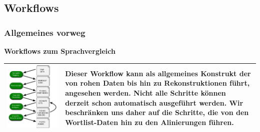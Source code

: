\subsection{\texorpdfstring{{Workflows}}{Workflows}}

\subsubsection{\texorpdfstring{{Allgemeines
vorweg}}{Allgemeines vorweg}}

\textbf{Workflows zum Sprachvergleich}

\begin{longtable}[c]{@{}ll@{}}
\toprule
\href{img/workflow_basic.svg}{\includegraphics{img/workflow_basic.svg}}
& Dieser Workflow kann als allgemeines Konstrukt der von rohen Daten bis
hin zu Rekonstruktionen führt, angesehen werden. Nicht alle Schritte
können derzeit schon automatisch ausgeführt werden. Wir beschränken uns
daher auf die Schritte, die von den Wortlist-Daten hin zu den
Alinierungen führen.\tabularnewline
\bottomrule
\end{longtable}

